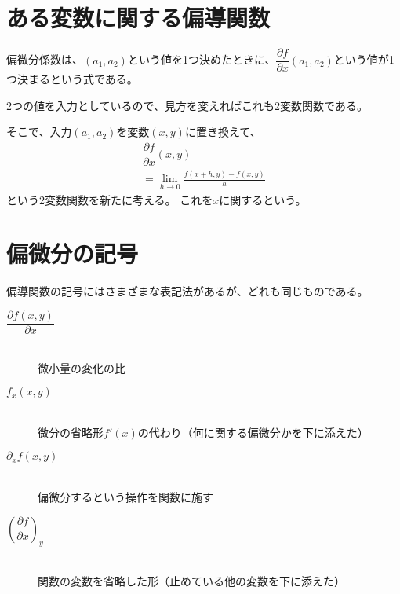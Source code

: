 \documentclass[../../../topic_multivariable-calculus]{subfiles}
\begin{document}
\sectionline
\section{ある変数に関する偏導関数}

偏微分係数は、$(a_1,a_2)$という値を1つ決めたときに、$\dfrac{\partial f}{\partial x}(a_1,a_2)$という値が1つ決まるという式である。

2つの値を入力としているので、見方を変えればこれも2変数関数である。

\br

そこで、入力$(a_1,a_2)$を変数$(x,y)$に置き換えて、
\begin{multline*}
  \dfrac{\partial f}{\partial x}(x,y) \\= \lim_{h \to 0} \frac{f(x + h, y) - f(x, y)}{h}
\end{multline*}
という2変数関数を新たに考える。
これを$x$に関するという。

\sectionline
\section{偏微分の記号}

偏導関数の記号にはさまざまな表記法があるが、どれも同じものである。

\br

\begin{description}
  \item [$\dfrac{\partial f(x,y)}{\partial x}$]~\\ 微小量の変化の比 \br
  \item [$f_x(x,y)$]~\\ 微分の省略形$f'(x)$の代わり（何に関する偏微分かを下に添えた）\br
  \item [$\partial_x f(x,y)$]~\\ 偏微分するという操作を関数に施す \br
  \item [$\left(\dfrac{\partial f }{\partial x}\right)_y$]~\\ 関数の変数を省略した形（止めている他の変数を下に添えた）
\end{description}
\end{document}
